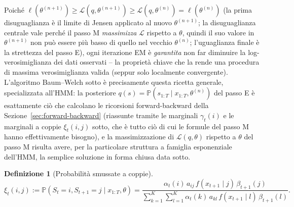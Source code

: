 \documentclass[11pt]{article}
\theoremstyle{definition}
\newtheorem{definition}[theorem]{Definizione}
\theoremstyle{remark}
\begin{document}
Poich\'e $\ell(\theta^{(n+1)})\ge\mathcal L(q,\theta^{(n+1)})\ge\mathcal L(q,\theta^{(n)})=\ell(\theta^{(n)})$ (la prima disuguaglianza \`e il limite di Jensen applicato al nuovo $\theta^{(n+1)}$; la disuguaglianza centrale vale perch\'e il passo M \emph{massimizza} $\mathcal L$ rispetto a $\theta$, quindi il suo valore in $\theta^{(n+1)}$ non pu\`o essere pi\`u basso di quello nel vecchio $\theta^{(n)}$; l'uguaglianza finale \`e la strettezza del passo E), ogni iterazione EM \`e \emph{garantita} non far diminuire la log-verosimiglianza dei dati osservati -- la propriet\`a chiave che la rende una procedura di massima verosimiglianza valida (seppur solo localmente convergente). L'algoritmo Baum--Welch sotto \`e precisamente questa ricetta generale, specializzata all'HMM: la posteriore $q(s)=\mathbb{P}(s_{1:T}\mid x_{1:T},\theta^{(n)})$ del passo E \`e esattamente ci\`o che calcolano le ricorsioni forward-backward della Sezione~\ref{sec:forward-backward} (riassunte tramite le marginali $\gamma_t(i)$ e le marginali a coppie $\xi_t(i,j)$ sotto, che \`e tutto ci\`o di cui le formule del passo M hanno effettivamente bisogno), e la massimizzazione di $\mathcal L(q,\theta)$ rispetto a $\theta$ del passo M risulta avere, per la particolare struttura a famiglia esponenziale dell'HMM, la semplice soluzione in forma chiusa data sotto.

\begin{definition}[Probabilit\`a smussate a coppie]
\[
\xi_t(i,j) := \mathbb{P}(S_t=i,S_{t+1}=j\mid x_{1:T},\theta) = \frac{\alpha_t(i)\,a_{ij}\,f(x_{t+1}\mid j)\,\beta_{t+1}(j)}{\sum_{k=1}^K\sum_{l=1}^K\alpha_t(k)\,a_{kl}\,f(x_{t+1}\mid l)\,\beta_{t+1}(l)}.
\]
\end{definition}
\end{document}

